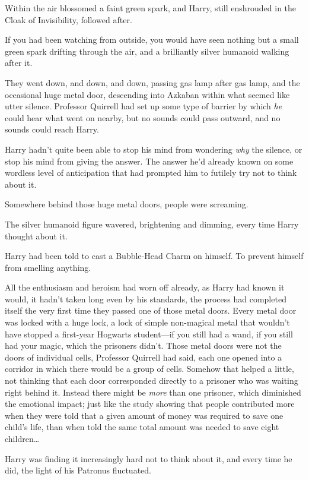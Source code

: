 Within the air blossomed a faint green spark, and Harry, still enshrouded in the Cloak of Invisibility, followed after.

If you had been watching from outside, you would have seen nothing but a small green spark drifting through the air, and a brilliantly silver humanoid walking after it.

\later

They went down, and down, and down, passing gas lamp after gas lamp, and the occasional huge metal door, descending into Azkaban within what seemed like utter silence. Professor Quirrell had set up some type of barrier by which \emph{he} could hear what went on nearby, but no sounds could pass outward, and no sounds could reach Harry.

Harry hadn’t quite been able to stop his mind from wondering \emph{why} the silence, or stop his mind from giving the answer. The answer he’d already known on some wordless level of anticipation that had prompted him to futilely try not to think about it.

Somewhere behind those huge metal doors, people were screaming.

The silver humanoid figure wavered, brightening and dimming, every time Harry thought about it.

Harry had been told to cast a Bubble-Head Charm on himself. To prevent himself from smelling anything.

All the enthusiasm and heroism had worn off already, as Harry had known it would, it hadn’t taken long even by his standards, the process had completed itself the very first time they passed one of those metal doors. Every metal door was locked with a huge lock, a lock of simple non-magical metal that wouldn’t have stopped a first-year Hogwarts student—if you still had a wand, if you still had your magic, which the prisoners didn’t. Those metal doors were not the doors of individual cells, Professor Quirrell had said, each one opened into a corridor in which there would be a group of cells. Somehow that helped a little, not thinking that each door corresponded directly to a prisoner who was waiting right behind it. Instead there might be \emph{more} than one prisoner, which diminished the emotional impact; just like the study showing that people contributed more when they were told that a given amount of money was required to save one child’s life, than when told the same total amount was needed to save eight children…

Harry was finding it increasingly hard not to think about it, and every time he did, the light of his Patronus fluctuated.

